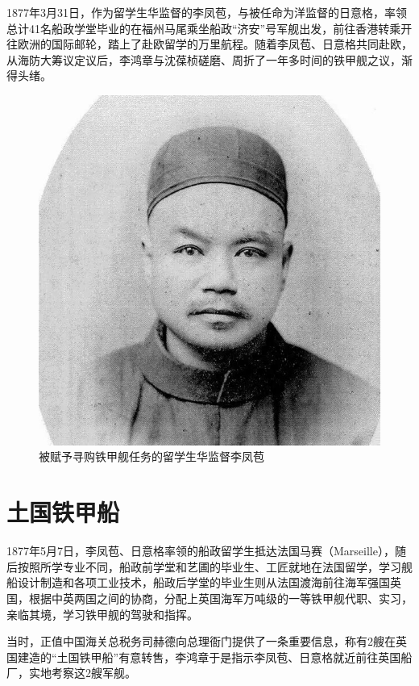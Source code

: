 \documentclass[12pt,UTF8]{ctexbook}
\begin{document}
1877年3月31日，作为留学生华监督的李凤苞，与被任命为洋监督的日意格，率领总计41名船政学堂毕业的在福州马尾乘坐船政“济安”号军舰出发，前往香港转乘开往欧洲的国际邮轮，踏上了赴欧留学的万里航程。随着李凤苞、日意格共同赴欧，从海防大筹议定议后，李鸿章与沈葆桢磋磨、周折了一年多时间的铁甲舰之议，渐得头绪。

\begin{figure}[htbp]
	\centering
	\includegraphics[width=1\linewidth]{Images/47}
	\caption{被赋予寻购铁甲舰任务的留学生华监督李凤苞}
	\label{fig:1}
\end{figure}

\section{土国铁甲船}

1877年5月7日，李凤苞、日意格率领的船政留学生抵达法国马赛（Marseille），随后按照所学专业不同，船政前学堂和艺圃的毕业生、工匠就地在法国留学，学习舰船设计制造和各项工业技术，船政后学堂的毕业生则从法国渡海前往海军强国英国，根据中英两国之间的协商，分配上英国海军万吨级的一等铁甲舰代职、实习，亲临其境，学习铁甲舰的驾驶和指挥。

当时，正值中国海关总税务司赫德向总理衙门提供了一条重要信息，称有2艘在英国建造的“土国铁甲船”有意转售，李鸿章于是指示李凤苞、日意格就近前往英国船厂，实地考察这2艘军舰。
\end{document}
